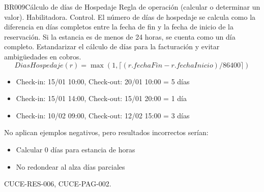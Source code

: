 \begin{BussinesRule}{BR009}{Cálculo de días de Hospedaje}
	\BRitem[Tipo:] Regla de operación (calcular o determinar un valor).
	\BRitem[Clase:] Habilitadora.
	\BRitem[Nivel:] Control.
	\BRitem[Descripción:] El número de días de hospedaje se calcula como la diferencia en días completos entre la fecha de fin y la fecha de inicio de la reservación. Si la estancia es de menos de 24 horas, se cuenta como un día completo.
	\BRitem[Motivación:] Estandarizar el cálculo de días para la facturación y evitar ambigüedades en cobros.
	\BRitem[Sentencia:] 
		\begin{displaymath}
			DiasHospedaje(r) = \max(1, \lceil (r.fechaFin - r.fechaInicio) / 86400 \rceil)
		\end{displaymath}
		\begin{itemize}
			\item Check-in: 15/01 10:00, Check-out: 20/01 10:00 = 5 días
			\item Check-in: 15/01 14:00, Check-out: 15/01 20:00 = 1 día
			\item Check-in: 10/02 09:00, Check-out: 12/02 15:00 = 3 días
		\end{itemize}
	 No aplican ejemplos negativos, pero resultados incorrectos serían:
		\begin{itemize}
			\item Calcular 0 días para estancia de horas
			\item No redondear al alza días parciales
		\end{itemize}
	 CUCE-RES-006, CUCE-PAG-002.
\end{BussinesRule}

